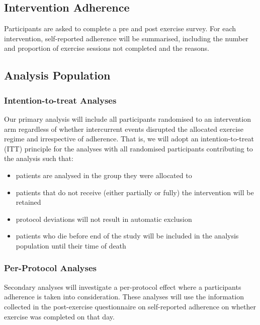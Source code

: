 \documentclass[
]{article}
\providecommand{\tightlist}{%
  \setlength{\itemsep}{0pt}\setlength{\parskip}{0pt}}
\begin{document}
\hypertarget{adherence}{%
  \subsection{Intervention Adherence}\label{adherence}}

Participants are asked to complete a pre and post exercise survey.
For each intervention, self-reported adherence will be summarised, including the number and proportion of exercise sessions not completed and the reasons. 

\hypertarget{analysis-population}{%
  \subsection{Analysis Population}\label{analysis-population}}

\subsubsection{Intention-to-treat Analyses}

Our primary analysis will include all participants randomised to an intervention arm regardless of whether intercurrent events disrupted the allocated exercise regime and irrespective of adherence.
That is, we will adopt an intention-to-treat (ITT) principle for the analyses with all randomised participants contributing to the analysis such that:

\begin{itemize}
  \tightlist
  \item patients are analysed in the group they were allocated to
  \item patients that do not receive (either partially or fully) the intervention will be retained
  \item protocol deviations will not result in automatic exclusion
  \item patients who die before end of the study  will be included in the analysis population until their time of death
\end{itemize}

\subsubsection{Per-Protocol Analyses}

Secondary analyses will investigate a per-protocol effect where a participants adherence is taken into consideration.
These analyses will use the information collected in the post-exercise questionnaire on self-reported adherence on whether exercise was completed on that day.
\end{document}
